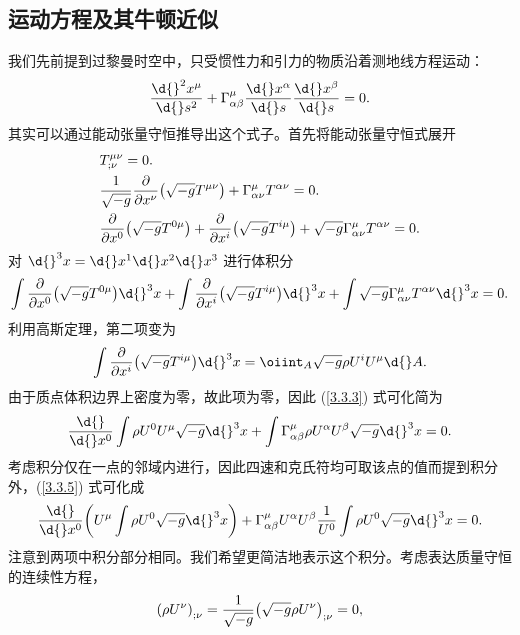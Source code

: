 \documentclass[UTF8, 12pt, a4paper, oneside, onecolumn, fontset=none]{ctexart}
\begin{document}
\subsection{运动方程及其牛顿近似}
我们先前提到过黎曼时空中，只受惯性力和引力的物质沿着测地线方程运动：
\begin{equation}
\frac{\d{}^{2}x^{\mu}}{\d{}s^{2}}+\Gamma_{\alpha\beta}^{\mu}\frac{\d{}x^{\alpha}}{\d{}s}\frac{\d{}x^{\beta}}{\d{}s}=0.
\end{equation}
其实可以通过能动张量守恒推导出这个式子。首先将能动张量守恒式展开
\begin{align}
&T^{\mu\nu}_{;\nu}=0.\\
&\frac{1}{\sqrt{-g}}\frac{\partial{}}{\partial{}x^{\nu}}\mleft(\sqrt{-g}T^{\mu\nu}\mright)+\Gamma_{\alpha\nu}^{\mu}T^{\alpha\nu}=0.\notag\\
&\frac{\partial{}}{\partial{}x^{0}}\mleft(\sqrt{-g}T^{0\mu}\mright)+\frac{\partial{}}{\partial{}x^{i}}\mleft(\sqrt{-g}T^{i\mu}\mright)+\sqrt{-g}\Gamma_{\alpha\nu}^{\mu}T^{\alpha\nu}=0.\notag
\end{align}
对 $\d{}^{3}x=\d{}x^{1}\d{}x^{2}\d{}x^{3}$ 进行体积分
\begin{equation}
\int\frac{\partial{}}{\partial{}x^{0}}\mleft(\sqrt{-g}T^{0\mu}\mright)\d{}^{3}x+\int\frac{\partial{}}{\partial{}x^{i}}\mleft(\sqrt{-g}T^{i\mu}\mright)\d{}^{3}x+\int\sqrt{-g}\Gamma_{\alpha\nu}^{\mu}T^{\alpha\nu}\d{}^{3}x=0.\label{3.3.3}
\end{equation}
利用高斯定理，第二项变为
\begin{equation}
\int\frac{\partial{}}{\partial{}x^{i}}\mleft(\sqrt{-g}T^{i\mu}\mright)\d{}^{3}x=\oiint_{A}\sqrt{-g}\rho U^{i}U^{\mu}\d{}A.
\end{equation}
由于质点体积边界上密度为零，故此项为零，因此 (\ref{3.3.3}) 式可化简为
\begin{equation}
\frac{\d{}}{\d{}x^{0}}\int\rho U^{0}U^{\mu}\sqrt{-g}\d{}^{3}x+\int\Gamma_{\alpha\beta}^{\mu}\rho U^{\alpha}U^{\beta}\sqrt{-g}\d{}^{3}x=0.\label{3.3.5}
\end{equation}
考虑积分仅在一点的邻域内进行，因此四速和克氏符均可取该点的值而提到积分外，(\ref{3.3.5}) 式可化成
\begin{equation}
\frac{\d{}}{\d{}x^{0}}\mleft(U^{\mu}\int\rho U^{0}\sqrt{-g}\d{}^{3}x\mright)+\Gamma_{\alpha\beta}^{\mu}U^{\alpha}U^{\beta}\frac{1}{U^{0}}\int\rho U^{0}\sqrt{-g}\d{}^{3}x=0.\label{3.3.6}
\end{equation}
注意到两项中积分部分相同。我们希望更简洁地表示这个积分。考虑表达质量守恒的连续性方程，
\begin{equation}
\mleft(\rho U^{\nu}\mright)_{;\nu}=\frac{1}{\sqrt{-g}}\mleft(\sqrt{-g}\rho U^{\nu}\mright)_{;\nu}=0,
\end{equation}
\end{document}
